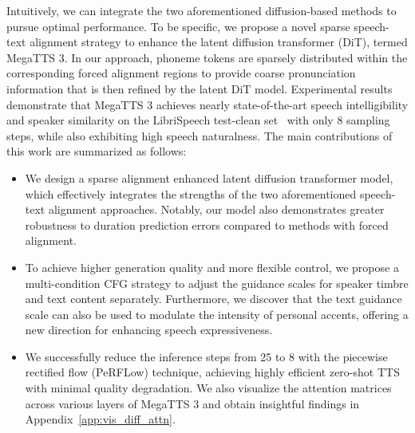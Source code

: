 Intuitively, we can integrate the two aforementioned diffusion-based methods to pursue optimal performance. To be specific, we propose a novel sparse speech-text alignment strategy to enhance the latent diffusion transformer (DiT), termed MegaTTS 3. In our approach, phoneme tokens are sparsely distributed within the corresponding forced alignment regions to provide coarse pronunciation information that is then refined by the latent DiT model. Experimental results demonstrate that MegaTTS 3 achieves nearly state-of-the-art speech intelligibility and speaker similarity on the LibriSpeech test-clean set~\citep{panayotov2015librispeech} with only 8 sampling steps, while also exhibiting high speech naturalness. The main contributions of this work are summarized as follows:

\begin{itemize}
\item We design a sparse alignment enhanced latent diffusion transformer model, which effectively integrates the strengths of the two aforementioned speech-text alignment approaches. Notably, our model also demonstrates greater robustness to duration prediction errors compared to methods with forced alignment. 

\item To achieve higher generation quality and more flexible control, we propose a multi-condition CFG strategy to adjust the guidance scales for speaker timbre and text content separately. Furthermore, we discover that the text guidance scale can also be used to modulate the intensity of personal accents, offering a new direction for enhancing speech expressiveness.

\item We successfully reduce the inference steps from 25 to 8 with the piecewise rectified flow (PeRFLow) technique, achieving highly efficient zero-shot TTS with minimal quality degradation. We also visualize the attention matrices across various layers of MegaTTS 3 and obtain insightful findings in Appendix~\ref{app:vis_diff_attn}.

\end{itemize}